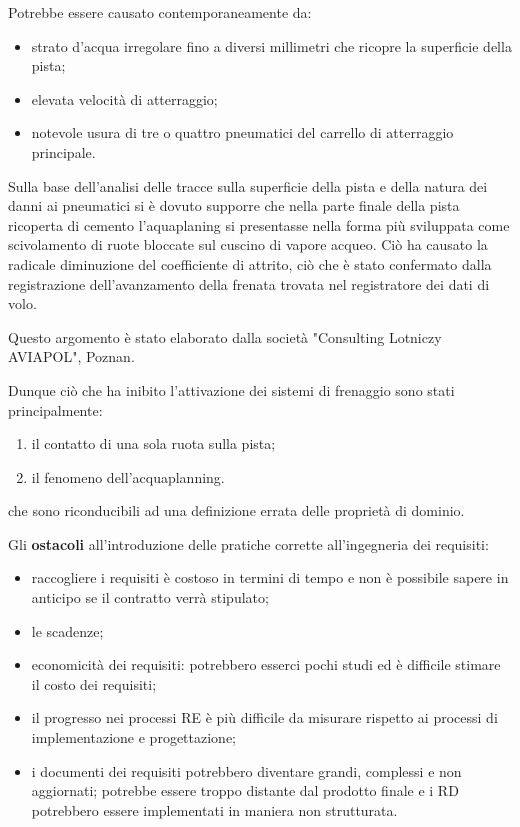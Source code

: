 \documentclass[italian]{article}
\begin{document}
	Potrebbe essere causato contemporaneamente da:

	\begin{itemize}
		\item strato d'acqua irregolare fino a diversi millimetri che ricopre la superficie della pista;
		\item  elevata velocità di atterraggio;
		\item  notevole usura di tre o quattro pneumatici del carrello di atterraggio principale.
	\end{itemize}

	Sulla base dell'analisi delle tracce sulla superficie della pista e della natura dei danni ai pneumatici si è dovuto supporre che nella parte finale della pista ricoperta di cemento l'aquaplaning si presentasse nella forma più sviluppata come scivolamento di ruote bloccate sul cuscino di vapore acqueo. Ciò ha causato la radicale diminuzione del coefficiente di attrito, ciò che è stato confermato dalla registrazione dell'avanzamento della frenata trovata nel registratore dei dati di volo.

	Questo argomento è stato elaborato dalla società "Consulting Lotniczy AVIAPOL", Poznan.

	Dunque ciò che ha inibito l'attivazione dei sistemi di frenaggio sono stati principalmente:
	\begin{enumerate}
		\item il contatto di una sola ruota sulla pista;
		\item il fenomeno dell'acquaplanning.
	\end{enumerate}
	che sono riconducibili ad una definizione errata delle proprietà di dominio.

	Gli \textbf{ostacoli} all'introduzione delle pratiche corrette all'ingegneria dei requisiti:
	\begin{itemize}
		\item raccogliere i requisiti è costoso in termini di tempo e non è possibile sapere in anticipo se il contratto verrà stipulato;
		\item le scadenze;
		\item economicità dei requisiti: potrebbero esserci pochi studi ed è difficile stimare il costo dei requisiti;
		\item il progresso nei processi RE è più difficile da misurare rispetto ai processi di implementazione e progettazione;
		\item i documenti dei requisiti potrebbero diventare grandi, complessi e non aggiornati; potrebbe essere troppo distante dal prodotto finale e i RD potrebbero essere implementati in maniera non strutturata.
	\end{itemize}
\end{document}
